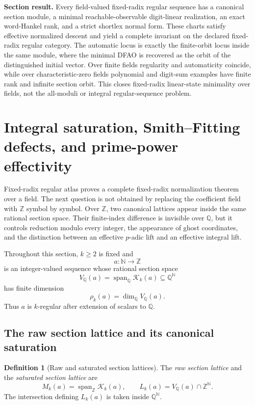 \documentclass[11pt]{article}
\theoremstyle{definition}
\newtheorem{definition}[theorem]{Definition}
\theoremstyle{remark}
\begin{document}
\begin{resultbox}
\textbf{Section result.}
Every field-valued fixed-radix regular sequence has a canonical section module, a minimal reachable-observable digit-linear realization, an exact word-Hankel rank, and a strict shortlex normal form.  These charts satisfy effective normalized descent and yield a complete invariant on the declared fixed-radix regular category.  The automatic locus is exactly the finite-orbit locus inside the same module, where the minimal DFAO is recovered as the orbit of the distinguished initial vector.  Over finite fields regularity and automaticity coincide, while over characteristic-zero fields polynomial and digit-sum examples have finite rank and infinite section orbit.  This closes fixed-radix linear-state minimality over fields, not the all-moduli or integral regular-sequence problem.
\end{resultbox}


\section{Integral saturation, Smith--Fitting defects, and prime-power effectivity}
\label{sec:block06-integral-prime-power}

Fixed-radix regular atlas proves a complete fixed-radix normalization theorem over a field.  The next question is not obtained by replacing the coefficient field with \(\mathbb Z\) symbol by symbol.  Over \(\mathbb Z\), two canonical lattices appear inside the same rational section space.  Their finite-index difference is invisible over \(\mathbb Q\), but it controls reduction modulo every integer, the appearance of ghost coordinates, and the distinction between an effective \(p\)-adic lift and an effective integral lift.

Throughout this section, \(k\geq2\) is fixed and
\[
a:\mathbb N\longrightarrow\mathbb Z
\]
is an integer-valued sequence whose rational section space
\[
V_{\mathbb Q}(a)
=
\operatorname{span}_{\mathbb Q}\mathcal K_k(a)
\subseteq
\mathbb Q^{\mathbb N}
\]
has finite dimension
\[
\rho_k(a)=\dim_{\mathbb Q}V_{\mathbb Q}(a).
\]
Thus \(a\) is \(k\)-regular after extension of scalars to \(\mathbb Q\).

\subsection{The raw section lattice and its canonical saturation}

\begin{definition}[Raw and saturated section lattices]
\label{def:block06-lattices}
The \emph{raw section lattice} and the \emph{saturated section lattice} are
\[
M_k(a)
=
\operatorname{span}_{\mathbb Z}\mathcal K_k(a),
\qquad
L_k(a)
=
V_{\mathbb Q}(a)\cap\mathbb Z^{\mathbb N}.
\]
The intersection defining \(L_k(a)\) is taken inside \(\mathbb Q^{\mathbb N}\).
\end{definition}
\end{document}
